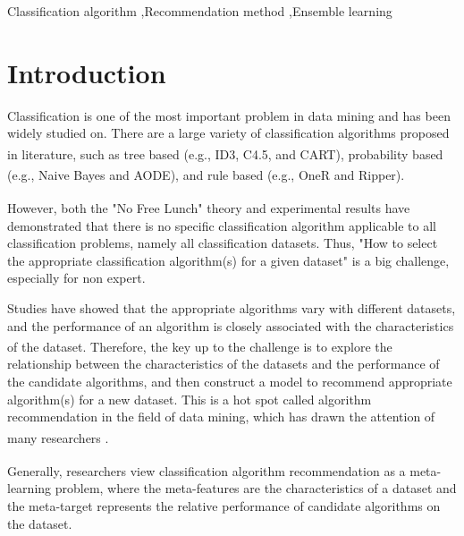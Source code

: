 \documentclass[review,3p,twocolumn,times]{elsarticle}
\newcommand{\upcite}[1]{\textsuperscript{\cite{#1}}}
\begin{document}
\begin{frontmatter}
\begin{keyword}
 Classification algorithm \sep Recommendation method \sep Ensemble learning 
\end{keyword}

\end{frontmatter}

\linenumbers

\section{Introduction}
\label{sec:introduction}

Classification is one of the most important problem in data mining and has been widely studied on. There are a large variety of classification algorithms proposed in literature, such as tree based (e.g., ID3\upcite{quinlan1979discovering}, C4.5\upcite{Quinlan1993Programs}, and CART\upcite{breiman1984classification}), probability based (e.g., Naive Bayes\upcite{Moore2005Internet} and AODE\upcite{webb2005not}), and rule based (e.g., OneR\upcite{holte1993very} and Ripper\upcite{Cohen1995Fast}). 

However, both the "No Free Lunch" theory\upcite{Wolpert2002The} and experimental results\upcite{Ali2006On,Brazdil2000A} have demonstrated that there is no specific classification algorithm applicable to all classification problems, namely all classification datasets. Thus, "How to select the appropriate classification algorithm(s) for a given dataset" is a big challenge, especially for non expert.

Studies have showed that the appropriate algorithms vary with different datasets, and the performance of an algorithm is closely associated with the characteristics of the dataset\upcite{song2012automatic}. Therefore, the key up to the challenge is to explore the relationship between the characteristics of the datasets and the performance of the candidate algorithms, and then construct a model to recommend appropriate algorithm(s) for a new dataset. This is a hot spot called algorithm recommendation in the field of data mining, which has drawn the attention of many researchers \upcite{Chekina2012Meta,Smith2009Cross,Brazdil:2008:MAD:1507541,Aha1992Generalizing,Wang2015An,Roy2017Meta,Smith2001Modelling,Smith2002Matching,Kalousis2004On,Gore2013Dynamic,Ali2017Accurate}.

Generally, researchers\upcite{Chekina2012Meta,Brazdil1994Characterizing,Gama1995Characterization,Smith2001Modelling,Smith2002Matching,Brazdil2003Ranking,Kalousis2004On} view classification algorithm recommendation as a meta-learning problem, where the meta-features are the characteristics of a dataset and the meta-target represents the relative performance of candidate algorithms on the dataset. 
\end{document}
